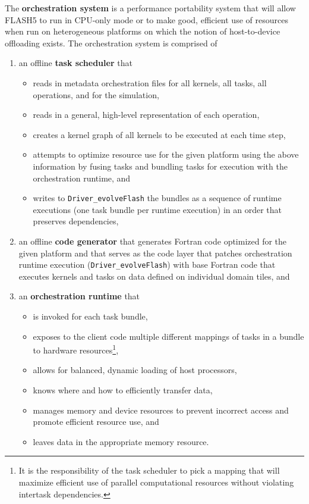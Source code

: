 \documentclass{article}
\begin{document}
The \textbf{orchestration system} is a performance portability system that will
allow FLASH5 to run in CPU-only mode or to make good, efficient use of resources
when run on heterogeneous platforms on which the notion of host-to-device
offloading exists. The orchestration system is comprised of
\begin{enumerate}
\item{an offline \textbf{task scheduler} that}
    \begin{itemize}
    \item{reads in metadata orchestration files for all kernels, all tasks, all
    operations, and for the simulation,}
    \item{reads in a general, high-level representation of each operation,}
    \item{creates a kernel graph of all kernels to be executed at each time step,}
    \item{attempts to optimize resource use for the given platform using the
    above information by fusing tasks and bundling tasks for
    execution with the orchestration runtime, and}
    \item{writes to \texttt{Driver\_evolveFlash} the bundles as a sequence of runtime executions (one task
    bundle per runtime execution) in an order that preserves dependencies,}
    \end{itemize}
\item{an offline \textbf{code generator} that generates Fortran code optimized
for the given platform and that serves as the code layer that patches
orchestration runtime execution (\texttt{Driver\_evolveFlash}) with base Fortran
code that executes kernels and tasks on data defined on individual domain tiles,
and}
\item{an \textbf{orchestration runtime} that}
    \begin{itemize}
    \item{is invoked for each task bundle,}
    \item{exposes to the client code multiple different mappings of tasks in a
    bundle to hardware resources\footnote{It is the responsibility of the task
    scheduler to pick a mapping that will maximize efficient use of parallel
    computational resources without violating intertask dependencies.},}
    \item{allows for balanced, dynamic loading of host processors,}
    \item{knows where and how to efficiently transfer data,}
    \item{manages memory and device resources to prevent incorrect access and
    promote efficient resource use, and}
    \item{leaves data in the appropriate memory resource.}
    \end{itemize}
\end{enumerate}
\end{document}
